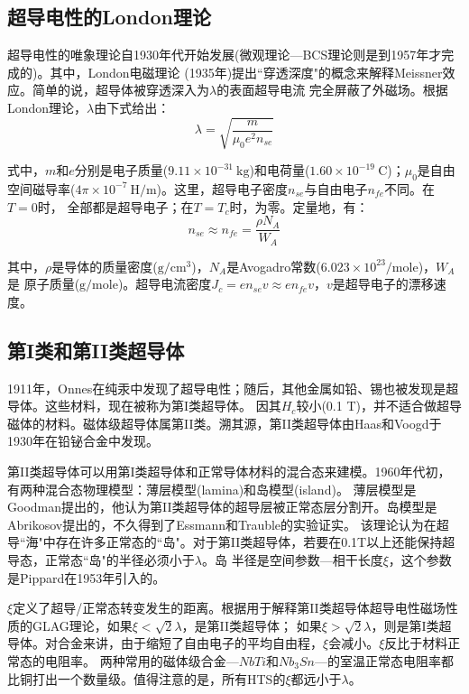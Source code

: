 \subsection{超导电性的London理论}
超导电性的唯象理论自1930年代开始发展(微观理论---BCS理论则是到1957年才完成的)。其中，London电磁理论
(1935年)提出``穿透深度"的概念来解释Meissner效应。简单的说，超导体被穿透深入为$\lambda$的表面超导电流
完全屏蔽了外磁场。根据London理论，$\lambda$由下式给出：
\begin{equation}
\lambda=\sqrt{\frac{m}{\mu_0 e^2 n_{se}}}
\end{equation}

式中，$m$和$e$分别是电子质量($9.11\times 10^{-31}\ \mathrm{kg}$)和电荷量($1.60\times 10^{-19}\ \mathrm{C}$)；$\mu_0$是自由
空间磁导率($4\pi \times 10^{-7}\ \mathrm{H/m}$)。这里，超导电子密度$n_{se}$与自由电子$n_{fe}$不同。在$T=0$时，
全部都是超导电子；在$T=T_c$时，为零。定量地，有：
\begin{equation}
n_{se}\approx n_{fe}=\frac{\rho N_A}{W_A}
\end{equation}

其中，$\rho$是导体的质量密度($\mathrm{g/cm^3}$)，$N_A$是Avogadro常数($6.023\times 10^{23}/\mathrm{mole}$)，$W_A$是
原子质量($\mathrm{g/mole}$)。超导电流密度$J_c=e n_{se} v\approx e n_{fe} v$，$v$是超导电子的漂移速度。

\subsection{第I类和第II类超导体}
1911年，Onnes在纯汞中发现了超导电性；随后，其他金属如铅、锡也被发现是超导体。这些材料，现在被称为第I类超导体。
因其$H_c$较小(0.1 T)，并不适合做超导磁体的材料。磁体级超导体属第II类。溯其源，第II类超导体由Haas和Voogd于
1930年在铅铋合金中发现。

第II类超导体可以用第I类超导体和正常导体材料的混合态来建模。1960年代初，有两种混合态物理模型：薄层模型(lamina)和岛模型(island)。
薄层模型是Goodman提出的，他认为第II类超导体的超导层被正常态层分割开。岛模型是Abrikosov提出的，不久得到了Essmann和Trauble的实验证实。
该理论认为在超导``海"中存在许多正常态的``岛"。对于第II类超导体，若要在0.1T以上还能保持超导态，正常态``岛"的半径必须小于$\lambda$。岛
半径是空间参数---相干长度$\xi$，这个参数是Pippard在1953年引入的。

$\xi$定义了超导/正常态转变发生的距离。根据用于解释第II类超导体超导电性磁场性质的GLAG理论，如果$\xi < \sqrt{2}\lambda$，是第II类超导体；
如果$\xi >\sqrt{2}\lambda$，则是第I类超导体。对合金来讲，由于缩短了自由电子的平均自由程，$\xi$会减小。$\xi$反比于材料正常态的电阻率。
两种常用的磁体级合金---$NbTi$和$Nb_3Sn$---的室温正常态电阻率都比铜打出一个数量级。值得注意的是，所有HTS的$\xi$都远小于$\lambda$。

